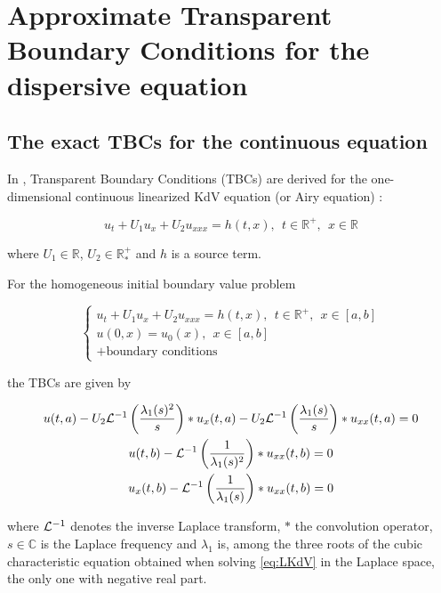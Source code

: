 \section{Approximate Transparent Boundary Conditions for the dispersive equation}
\label{sec:TBC}

\subsection{The exact TBCs for the continuous equation}

\indent In \cite{besse2015}, Transparent Boundary Conditions (TBCs) are derived for the one-dimensional continuous linearized KdV equation (or Airy equation) :

\begin{equation}
 	\label{eq:LKdV}
 	u_t + U_1u_x + U_2u_{xxx} = h(t,x), \ \ t \in \mathbb{R}^+, \ \ x \in \mathbb{R}
\end{equation}

\noindent where $U_1 \in \mathbb{R}$, $U_2 \in \mathbb{R}^+_*$ and $h$ is a source term.

\indent For the homogeneous initial boundary value problem 

\begin{equation*}
\begin{cases}
	u_t + U_1u_x + U_2u_{xxx} = h(t,x), \ \ t \in \mathbb{R}^+, \ \ x \in [a,b] \\
	u(0,x) = u_0(x), \ \ x \in [a,b] \\
	+ \text{boundary conditions} \nonumber
\end{cases}
\end{equation*}

\noindent the TBCs are given by 

\begin{equation}
\label{eq:continuousTBC}
\begin{gathered}
        u(t,a) - U_2 \mathcal{L}^{-1} \left( \frac{\lambda_1(s)^2}{s} \right) * u_x(t,a) - U_2 \mathcal{L}^{-1} \left( \frac{\lambda_1(s)}{s} \right) * u_{xx}(t,a) = 0 \\ 
        u(t,b) - \mathcal{L}^{-1} \left( \frac{1}{\lambda_1(s)^2} \right) * u_{xx}(t,b) = 0 \\
        u_x(t,b) - \mathcal{L}^{-1} \left( \frac{1}{\lambda_1(s)} \right) * u_{xx}(t,b) = 0 
\end{gathered}
\end{equation}

\noindent where $\mathcal{L}^{-1}$ denotes the inverse Laplace transform, $*$ the convolution operator, $s \in \mathbb{C}$ is the Laplace frequency and $\lambda_1$ is, among the three roots of the cubic characteristic equation obtained when solving \eqref{eq:LKdV} in the Laplace space, the only one with negative real part.

